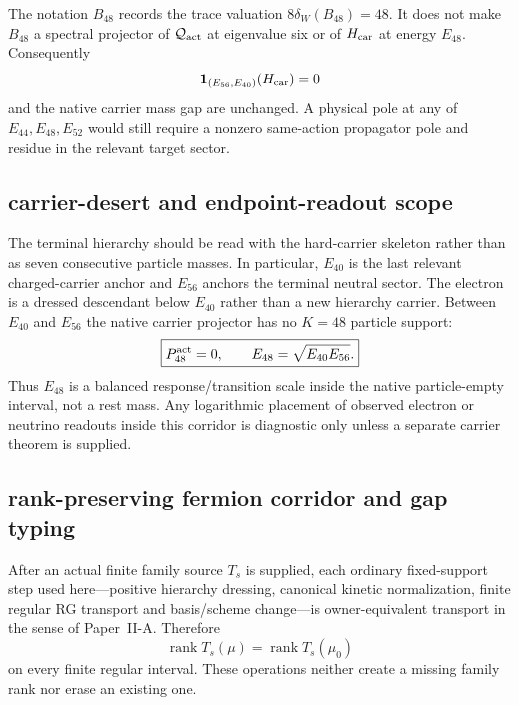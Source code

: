 \documentclass[12pt,a4paper]{article}
\begin{document}
\begin{corollary}
\label{p6:cor:v166-transverse-bridge-no-pole}
The notation \(B_{48}\) records the trace valuation
\(8\delta_W(B_{48})=48\).  It does not make \(B_{48}\) a spectral projector
of \(\mathcal Q_{\rm act}\) at eigenvalue six or of \(H_{\rm car}\) at
energy \(E_{48}\).  Consequently
\[
 \mathbf1_{(E_{56},E_{40})}(H_{\rm car})=0
\]
and the native carrier mass gap are unchanged.  A physical pole at any of
\(E_{44},E_{48},E_{52}\) would still require a nonzero same-action propagator
pole and residue in the relevant target sector.
\end{corollary}




\subsection{carrier-desert and endpoint-readout scope}
\label{p5b:sec:v565-carrier-desert-scope}

The terminal hierarchy should be read with the hard-carrier skeleton rather
than as seven consecutive particle masses.  In particular, $E_{40}$ is the
last relevant charged-carrier anchor and $E_{56}$ anchors the terminal neutral
sector.  The electron is a dressed descendant below $E_{40}$ rather than a new
hierarchy carrier.  Between $E_{40}$ and $E_{56}$ the native carrier projector
has no $K=48$ particle support:
\[
 \boxed{P_{48}^{\rm act}=0,\qquad E_{48}=\sqrt{E_{40}E_{56}}.}
\]
Thus $E_{48}$ is a balanced response/transition scale inside the native
particle-empty interval, not a rest mass.  Any logarithmic placement of
observed electron or neutrino readouts inside this corridor is diagnostic only
unless a separate carrier theorem is supplied.


\subsection{rank-preserving fermion corridor and gap typing}
\label{p6:sec:v581-fermion-rank-corridor}

\begin{proposition}
\label{p6:prop:v581-rank-preserving-corridor}
After an actual finite family source $T_s$ is supplied, each ordinary
fixed-support step used here---positive hierarchy dressing, canonical kinetic
normalization, finite regular RG transport and basis/scheme change---is
owner-equivalent transport in the sense of Paper~II-A.  Therefore
\[
 \boxed{\operatorname{rank}T_s(\mu)=\operatorname{rank}T_s(\mu_0)}
\]
on every finite regular interval.  These operations neither create a missing
family rank nor erase an existing one.
\end{proposition}
\end{document}
